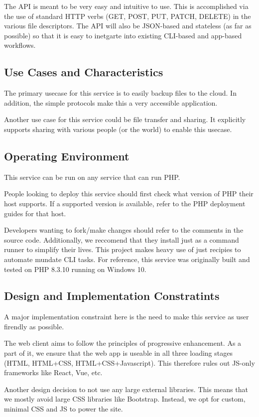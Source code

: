 \documentclass[12pt,a4paper]{report}
\begin{document}
The API is meant to be very easy and intuitive to use. This is accomplished via the use of standard HTTP verbs (GET, POST, PUT, PATCH, DELETE) in the various file descriptors. The API will also be JSON-based and stateless (as far as possible) so that it is easy to inetgarte into existing CLI-based and app-based workflows.
\subsection{Use Cases and Characteristics}
The primary usecase for this service is to easily backup files to the cloud. In addition, the simple protocols make this a very accessible application.

Another use case for this service could be file transfer and sharing. It explicitly supports sharing with various people (or the world) to enable this usecase.
\subsection{Operating Environment}
This service can be run on any service that can run PHP.

People looking to deploy this service should first check what version of PHP their host supports. If a supported version is available, refer to the PHP deployment guides for that host.

Developers wanting to fork/make changes should refer to the comments in the source code. Additionally, we reccomend that they install just as a command runner to simplify their lives. This project makes heavy use of just recipies to automate mundate CLI tasks. For reference, this service was originally built and tested on PHP 8.3.10 running on Windows 10.
\subsection{Design and Implementation Constratints}
A major implementation constraint here is the need to make this service as user firendly as possible.

The web client aims to follow the principles of progressive enhancement. As a part of it, we ensure that the web app is useable in all three loading stages (HTML, HTML+CSS, HTML+CSS+Javascript). This therefore rules out JS-only frameworks like React, Vue, etc.

Another design decision to not use any large external libraries. This means that we mostly avoid large CSS libraries like Bootstrap. Instead, we opt for custom, minimal CSS and JS to power the site.
\end{document}
